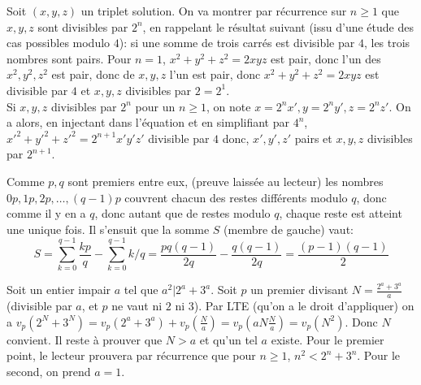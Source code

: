 \begin{sol}[22]
		Soit $(x,y,z)$ un triplet solution. On va montrer par r\'ecurrence sur $n \geq 1$ que $x,y,z$ sont divisibles par $2^n$, en rappelant le r\'esultat suivant (issu d'une \'etude des cas possibles modulo $4$): si une somme de trois carr\'es est divisible par $4$, les trois nombres sont pairs. Pour $n=1$, $x^2+y^2+z^2=2xyz$ est pair, donc l'un des $x^2,y^2,z^2$ est pair, donc de $x,y,z$ l'un est pair, donc $x^2+y^2+z^2=2xyz$ est divisible par $4$ et $x,y,z$ divisibles par $2=2^1$. \\
		Si $x,y,z$ divisibles par $2^n$ pour un $n \geq 1$, on note $x=2^nx',y=2^ny',z=2^nz'$. On a alors, en injectant dans l'\'equation et en simplifiant par $4^n$, $x'^2+y'^2+z'^2=2^{n+1}x'y'z'$ divisible par $4$ donc, $x',y',z'$ pairs et $x,y,z$ divisibles par $2^{n+1}$.  
\end{sol}

\begin{sol}[23]
		Comme $p,q$ sont premiers entre eux, (preuve laiss\'ee au lecteur) les nombres $0p, 1p, 2p, \ldots, (q-1)p$ couvrent chacun des restes diff\'erents modulo $q$, donc comme il y en a $q$, donc autant que de restes modulo $q$, chaque reste est atteint une unique fois. Il s'ensuit que la somme $S$ (membre de gauche) vaut:
			\[S=\sum_{k=0}^{q-1}{\frac{kp}{q}}-\sum_{k=0}^{q-1}{k/q}=\frac{pq(q-1)}{2q}-\frac{q(q-1)}{2q}=\frac{(p-1)(q-1)}{2}\]
\end{sol}

\begin{sol}[24]
		Soit un entier impair $a$ tel que $a^2|2^a+3^a$. Soit $p$ un premier divisant $N=\frac{2^a+3^a}{a}$ (divisible par $a$, et $p$ ne vaut ni $2$ ni $3$). 
		Par LTE (qu'on a le droit d'appliquer) on a $v_p(2^N+3^N)= v_p(2^a+3^a)+v_p(\frac{N}{a})=v_p(aN\frac{N}{a})=v_p(N^2)$. Donc $N$ convient. Il reste \`a prouver que $N > a$ et qu'un tel $a$ existe. Pour le premier point, le lecteur prouvera par r\'ecurrence que pour $n \geq 1$, $n^2 < 2^n+3^n$. Pour le second, on prend $a=1$. 
\end{sol}

